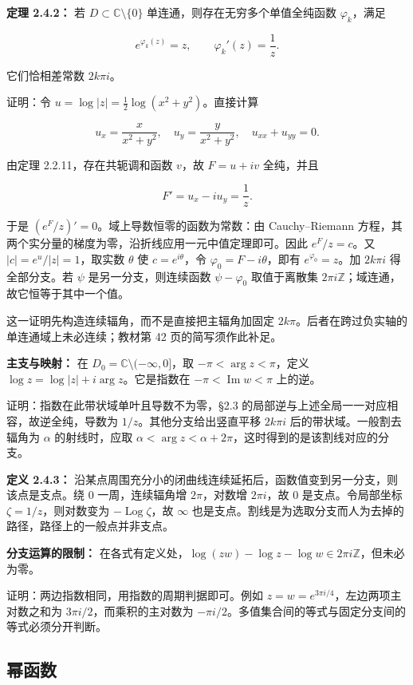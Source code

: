 \documentclass[11pt,a4paper]{article}
\begin{document}
\textbf{定理 2.4.2：} 若 \(D\subset\mathbb C\setminus\{0\}\)
单连通，则存在无穷多个单值全纯函数 \(\varphi_k\)，满足

\[
e^{\varphi_k(z)}=z,\qquad \varphi_k'(z)=\frac1z.
\]

它们恰相差常数 \(2k\pi i\)。

证明：令 \(u=\log|z|=\tfrac12\log(x^2+y^2)\)。直接计算

\[
u_x=\frac{x}{x^2+y^2},\quad u_y=\frac{y}{x^2+y^2},\quad
u_{xx}+u_{yy}=0.
\]

由定理 2.2.11，存在共轭调和函数 \(v\)，故 \(F=u+iv\) 全纯，并且

\[
F'=u_x-iu_y=\frac1z.
\]

于是 \((e^F/z)'=0\)。域上导数恒零的函数为常数：由 Cauchy--Riemann
方程，其两个实分量的梯度为零，沿折线应用一元中值定理即可。因此
\(e^F/z=c\)。又 \(|c|=e^u/|z|=1\)，取实数 \(\theta\) 使
\(c=e^{i\theta}\)，令 \(\varphi_0=F-i\theta\)，即有
\(e^{\varphi_0}=z\)。加 \(2k\pi i\) 得全部分支。若 \(\psi\)
是另一分支，则连续函数 \(\psi-\varphi_0\) 取值于离散集
\(2\pi i\mathbb Z\)；域连通，故它恒等于其中一个值。

这一证明先构造连续辐角，而不是直接把主辐角加固定
\(2k\pi\)。后者在跨过负实轴的单连通域上未必连续；教材第 42
页的简写须作此补足。

\textbf{主支与映射：} 在 \(D_0=\mathbb C\setminus(-\infty,0]\)，取
\(-\pi<\arg z<\pi\)，定义 \(\log z=\log|z|+i\arg z\)。它是指数在
\(-\pi<\operatorname{Im}w<\pi\) 上的逆。

证明：指数在此带状域单叶且导数不为零，§2.3
的局部逆与上述全局一一对应相容，故逆全纯，导数为
\(1/z\)。其他分支给出竖直平移 \(2k\pi i\) 后的带状域。一般割去辐角为
\(\alpha\) 的射线时，应取
\(\alpha<\arg z<\alpha+2\pi\)，这时得到的是该割线对应的分支。

\textbf{定义 2.4.3：}
沿某点周围充分小的闭曲线连续延拓后，函数值变到另一分支，则该点是支点。绕
\(0\) 一周，连续辐角增 \(2\pi\)，对数增 \(2\pi i\)，故 \(0\)
是支点。令局部坐标 \(\zeta=1/z\)，则对数变为
\(-\operatorname{Log}\zeta\)，故 \(\infty\)
也是支点。割线是为选取分支而人为去掉的路径，路径上的一般点并非支点。

\textbf{分支运算的限制：}
在各式有定义处，\(\log(zw)-\log z-\log w\in2\pi i\mathbb Z\)，但未必为零。

证明：两边指数相同，用指数的周期判据即可。例如
\(z=w=e^{3\pi i/4}\)，左边两项主对数之和为
\(3\pi i/2\)，而乘积的主对数为
\(-\pi i/2\)。多值集合间的等式与固定分支间的等式必须分开判断。

\subsection{幂函数}\label{ch02-s4-ux5e42ux51fdux6570}
\end{document}
